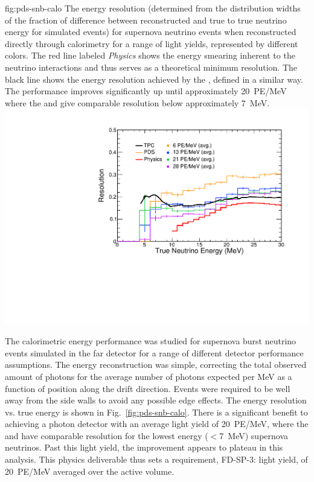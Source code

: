 \begin{dunefigure}
{fig:pds-snb-calo}
{The energy resolution (determined from the distribution widths of the fraction of difference between reconstructed and true  to true neutrino energy for simulated events) for supernova neutrino events when reconstructed directly through  calorimetry for a range of light yields, represented by different colors. The red line labeled \textit{Physics} 
shows the energy smearing inherent to the neutrino interactions and thus serves as a theoretical minimum resolution. The black line shows the energy resolution achieved by the , defined in a similar way. The performance improves significantly up until approximately \SI{20}{PE/MeV} where the  and  give comparable resolution below approximately \SI{7}{MeV}.
}
  \includegraphics[width=0.6\columnwidth]{graphics/pds-snb-res-vs-true.pdf}
 \end{dunefigure}

The calorimetric energy performance was studied for supernova burst neutrino events simulated in the far detector for a range of different detector performance assumptions. The energy reconstruction was simple, correcting the total observed amount of photons for the average number of photons expected per MeV as a function of position along the drift direction. Events were required to be well away from the side walls to avoid any possible edge effects. The energy resolution vs. true energy is shown in Fig.~\ref{fig:pds-snb-calo}. There is a significant benefit to achieving a photon detector with an average light yield of \SI{20}{PE/MeV}, where the  and  have comparable resolution for the lowest energy ($<$\SI{7}{MeV}) supernova neutrinos. Past this light yield, the improvement appears to plateau in this analysis. This physics deliverable thus sets a requirement, FD-SP-3: light yield, of \SI{20}{PE/MeV} averaged over the active volume.

